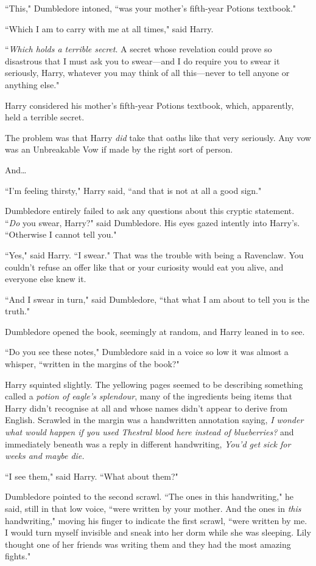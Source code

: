 ``This," Dumbledore intoned, ``was your mother's fifth-year Potions textbook."

``Which I am to carry with me at all times," said Harry.

``\emph{Which holds a terrible secret}. A secret whose revelation could prove so disastrous that I must ask you to swear—and I do require you to swear it seriously, Harry, whatever you may think of all this—never to tell anyone or anything else."

Harry considered his mother's fifth-year Potions textbook, which, apparently, held a terrible secret.

The problem was that Harry \emph{did} take that oaths like that very seriously. Any vow was an Unbreakable Vow if made by the right sort of person.

And{\ldots}

``I'm feeling thirsty," Harry said, ``and that is not at all a good sign."

Dumbledore entirely failed to ask any questions about this cryptic statement. ``\emph{Do} you swear, Harry?" said Dumbledore. His eyes gazed intently into Harry's. ``Otherwise I cannot tell you."

``Yes," said Harry. ``I swear." That was the trouble with being a Ravenclaw. You couldn't refuse an offer like that or your curiosity would eat you alive, and everyone else knew it.

``And I swear in turn," said Dumbledore, ``that what I am about to tell you is the truth."

Dumbledore opened the book, seemingly at random, and Harry leaned in to see.

``Do you see these notes," Dumbledore said in a voice so low it was almost a whisper, ``written in the margins of the book?"

Harry squinted slightly. The yellowing pages seemed to be describing something called a \emph{potion of eagle's splendour}, many of the ingredients being items that Harry didn't recognise at all and whose names didn't appear to derive from English. Scrawled in the margin was a handwritten annotation saying, \emph{I wonder what would happen if you used Thestral blood here instead of blueberries?} and immediately beneath was a reply in different handwriting, \emph{You'd get sick for weeks and maybe die.}

``I see them," said Harry. ``What about them?"

Dumbledore pointed to the second scrawl. ``The ones in this handwriting," he said, still in that low voice, ``were written by your mother. And the ones in \emph{this} handwriting," moving his finger to indicate the first scrawl, ``were written by me. I would turn myself invisible and sneak into her dorm while she was sleeping. Lily thought one of her friends was writing them and they had the most amazing fights."

